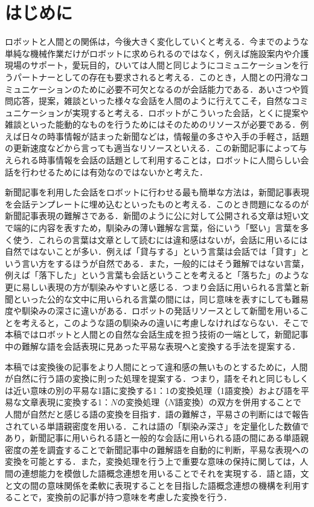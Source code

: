 \documentclass[japanese]{jnlp_1.4}
\begin{document}
\maketitle


\section{はじめに}
\label{First}

ロボットと人間との関係は，今後大きく変化していくと考える．今までのような単純な機械作業だけがロボットに求められるのではなく，例えば施設案内や介護現場のサポート，愛玩目的，ひいては人間と同じようにコミュニケーションを行うパートナーとしての存在も要求されると考える．このとき，人間との円滑なコミュニケーションのために必要不可欠となるのが会話能力である．あいさつや質問応答，提案，雑談といった様々な会話を人間のように行えてこそ，自然なコミュニケーションが実現すると考える．ロボットがこういった会話，とくに提案や雑談といった能動的なものを行うためにはそのためのリソースが必要である．例えば日々の時事情報が詰まった新聞などは，情報量の多さや入手の手軽さ，話題の更新速度などから言っても適当なリソースといえる．この新聞記事によって与えられる時事情報を会話の話題として利用することは，ロボットに人間らしい会話を行わせるためには有効なのではないかと考えた．

新聞記事を利用した会話をロボットに行わせる最も簡単な方法は，新聞記事表現を会話テンプレートに埋め込むといったものと考える．このとき問題になるのが新聞記事表現の難解さである．新聞のように公に対して公開される文章は短い文で端的に内容を表すため，馴染みの薄い難解な言葉，俗にいう「堅い」言葉を多く使う．これらの言葉は文章として読むには違和感はないが，会話に用いるには自然ではないことが多い．例えば「貸与する」という言葉は会話では「貸す」という言い方をするほうが自然である．また，一般的にはそう難解ではない言葉，例えば「落下した」という言葉も会話ということを考えると「落ちた」のような更に易しい表現の方が馴染みやすいと感じる．つまり会話に用いられる言葉と新聞といった公的な文中に用いられる言葉の間には，同じ意味を表すにしても難易度や馴染みの深さに違いがある．ロボットの発話リソースとして新聞を用いることを考えると，このような語の馴染みの違いに考慮しなければならない．そこで本稿ではロボットと人間との自然な会話生成を担う技術の一端として，新聞記事中の難解な語を会話表現に見あった平易な表現へと変換する手法を提案する．

本稿では変換後の記事をより人間にとって違和感の無いものとするために，人間が自然に行う語の変換に則った処理を提案する．つまり，語をそれと同じもしくは近い意味の別の平易な1語に変換する1：1の変換処理（1語変換）および語を平易な文章表現に変換する1：$N$の変換処理（$N$語変換）の双方を併用することで人間が自然だと感じる語の変換を目指す．語の難解さ，平易さの判断には\cite{Book_01}で報告されている単語親密度を用いる．これは語の「馴染み深さ」を定量化した数値であり，新聞記事に用いられる語と一般的な会話に用いられる語の間にある単語親密度の差を調査することで新聞記事中の難解語を自動的に判断，平易な表現への変換を可能とする．また，変換処理を行う上で重要な意味の保持に関しては，人間の連想能力を模倣した語概念連想を用いることでそれを実現する．語と語，文と文の間の意味関係を柔軟に表現することを目指した語概念連想の機構を利用することで，変換前の記事が持つ意味を考慮した変換を行う．
\end{document}
